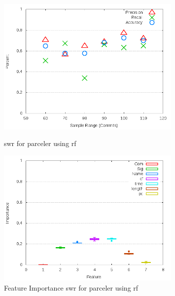 \begin{figure}[!t]
    \centering
        \includegraphics[width=0.8\textwidth]{images/rf/test_1/parceler_sample_range}
        \caption{\gls{swr} for parceler using \gls{rf}}
        \label{fig:test_1_parceler_rf}

    \includegraphics[width=0.8\textwidth]{images/rf/test_1/parceler_importance}
        \caption{Feature Importance \gls{swr} for parceler using \gls{rf}}
        \label{fig:test_1_parceler_rf_importance}
\end{figure}

